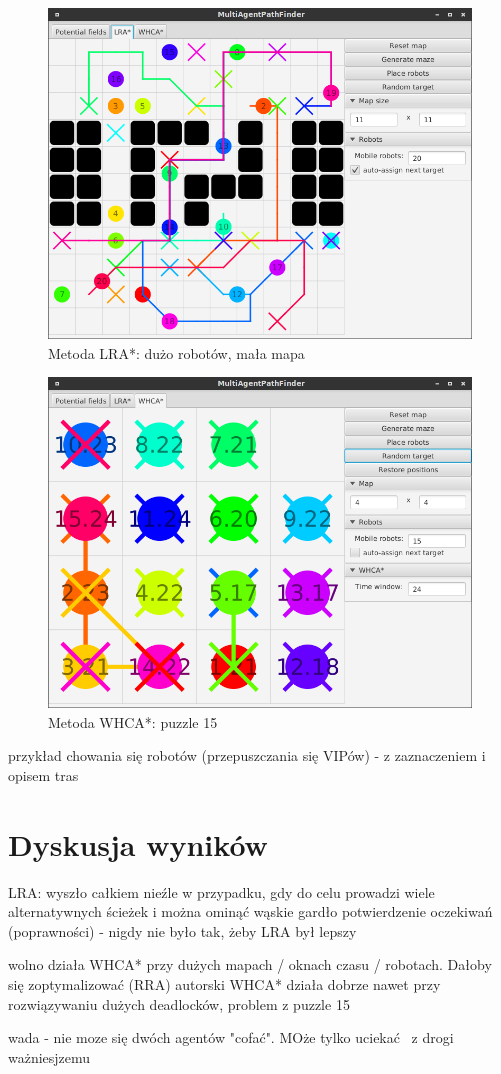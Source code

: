 
\begin{figure}
	\centering
	\includegraphics[width=0.8\columnwidth]{img/robopath/lra-lot-robots}
	\caption{Metoda LRA*: dużo robotów, mała mapa}
	\label{fig:test-lra-lot-robots}
\end{figure}

\begin{figure}
	\centering
	\includegraphics[width=0.8\columnwidth]{img/robopath/puzzle-15}
	\caption{Metoda WHCA*: puzzle 15}
	\label{fig:test-puzzle-15}
\end{figure}

przykład chowania się robotów (przepuszczania się VIPów) - z zaznaczeniem i opisem tras

\section{Dyskusja wyników}
LRA: wyszło całkiem nieźle w przypadku, gdy do celu prowadzi wiele alternatywnych ścieżek i można ominąć wąskie gardło
potwierdzenie oczekiwań (poprawności) - nigdy nie było tak, żeby LRA był lepszy

wolno działa WHCA* przy dużych mapach / oknach czasu / robotach. Dałoby się zoptymalizować (RRA)
autorski WHCA* działa dobrze nawet przy rozwiązywaniu dużych deadlocków, problem z puzzle 15

wada - nie moze się dwóch agentów "cofać". MOże tylko uciekać  z drogi ważniesjzemu